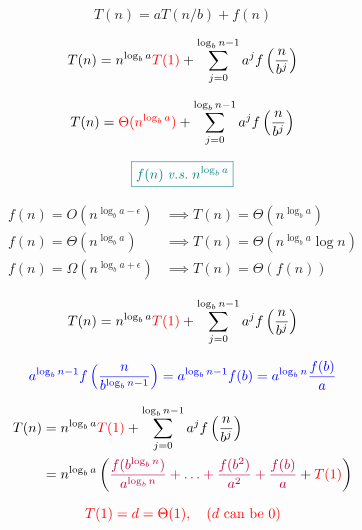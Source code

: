 
\begin{frame}{}
  \[
    T(n) = a T(n/b) + f(n)
  \]


  \[
    T(n) = n^{\log_{b}{a}} \textcolor{red}{T(1)} + 
        \sum_{j = 0}^{\log_{b}{n} - 1} a^{j} f\left(\frac{n}{b^{j}}\right)
  \]
\end{frame}

\begin{frame}{}
  \[
    T(n) = \textcolor{red}{\Theta(n^{\log_{b}{a}})} + 
        \sum_{j = 0}^{\log_{b}{n} - 1} a^{j} f\left(\frac{n}{b^{j}}\right)
  \]

  \[
    \textcolor{teal}{\boxed{f(n) \;\text{\it v.s.}\; n^{\log_{b}{a}}}}
  \]

  \begin{align*}
    f(n) = O(n^{\log_{b}{a} - \epsilon}) &\implies T(n) = \Theta(n^{\log_{b}{a}}) \\[8pt]
    f(n) = \Theta(n^{\log_{b}{a}}) &\implies T(n) = \Theta(n^{\log_{b}{a}} \log n) \\[8pt]
    f(n) = \Omega(n^{\log_{b}{a} + \epsilon}) &\implies T(n) = \Theta(f(n))
  \end{align*}
\end{frame}

\begin{frame}{}
  \[
    T(n) = n^{\log_{b}{a}} \textcolor{red}{T(1)} + 
        \sum_{j = 0}^{\log_{b}{n} - 1} a^{j} f\left( \frac{n}{b^{j}} \right)
  \]

  \pause
  \[
    \textcolor{blue}{a^{\log_{b}{n} - 1} f\left( \frac{n}{b^{\log_{b}{n} - 1}} \right) 
        = a^{\log_{b}{n} - 1} f(b) = a^{\log_{b}{n}} \frac{f(b)}{a}}
  \]

  \pause
  \begin{align*}
    T(n) &= n^{\log_{b}{a}} \textcolor{red}{T(1)} + 
        \sum_{j = 0}^{\log_{b}{n} - 1} a^{j} f\left(\frac{n}{b^{j}} \right) \\
        &= n^{\log_{b}{a}} \left( \textcolor{purple}{\frac{f(b^{\log_{b}{n}})}{a^{\log_{b}{n}}} + \ldots + \frac{f(b^2)}{a^2} + \frac{f(b)}{a}} + \textcolor{red}{T(1)} \right)
  \end{align*}

  \pause
  \begin{center}
  \end{center}

  \[
    \textcolor{red}{T(1) = d = \Theta(1), \quad (d \text{ can be } 0)}
  \]
\end{frame}

